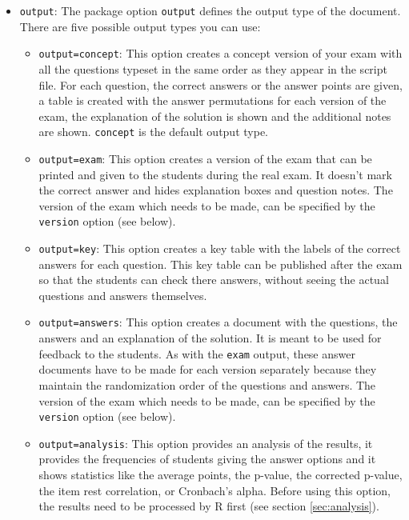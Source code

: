 \documentclass{article}
\begin{document}
\begin{itemize}
 \item \verb$output$: 
       The package  option \verb$output$ defines the output type of the document. There are five possible output types you can use:
       \begin{itemize}
       \item \verb$output=concept$: 
             This option creates a concept version of your exam with all the questions typeset in the same order as they appear in the script file. For each question, the correct answers or the answer points are given, a table is created with the answer permutations for each version of the exam, the explanation of the solution is shown and the additional notes are shown. \verb$concept$ is the default output type.
       \item \verb$output=exam$: 
             This option creates a version of the exam that can be printed and given to the students during the real exam. It doesn't mark the correct answer and hides explanation boxes and question notes. The version of the exam which needs to be made, can be specified by the \verb$version$ option (see below).
       \item \verb$output=key$: 
             This option creates a key table with the labels of the correct answers for each question. This key table can be published after the exam so that the students can check there answers, without seeing the actual questions and answers themselves.
       \item \verb$output=answers$: 
             This option creates a document with the questions, the answers and an explanation of the solution. It is meant to be used for feedback to the students. As with the \verb+exam+ output, these answer documents have to be made for each version separately because they maintain the randomization order of the questions and answers. The version of the exam which needs to be made, can be specified by the \verb$version$ option (see below).
       \item \verb$output=analysis$: 
             This option provides an analysis of the results, it provides the frequencies of students giving the answer options and it shows statistics like the average points, the p-value, the corrected p-value, the item rest correlation, or Cronbach's alpha. Before using this option, the results need to be processed by R first (see section \ref{sec:analysis}).
       \end{itemize}
       

\end{itemize}
\end{document}

